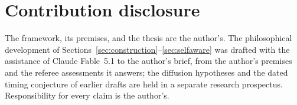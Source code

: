 \section*{Contribution disclosure}

\noindent The framework, its premises, and the thesis are the author's. The
philosophical development of Sections~\ref{sec:construction}--\ref{sec:selfaware}
was drafted with the assistance of Claude Fable~5.1 to the author's brief,
from the author's premises and the referee assessments it answers; the
diffusion hypotheses and the dated timing conjecture of earlier drafts are
held in a separate research prospectus. Responsibility for every claim is
the author's.

\printbibliography

